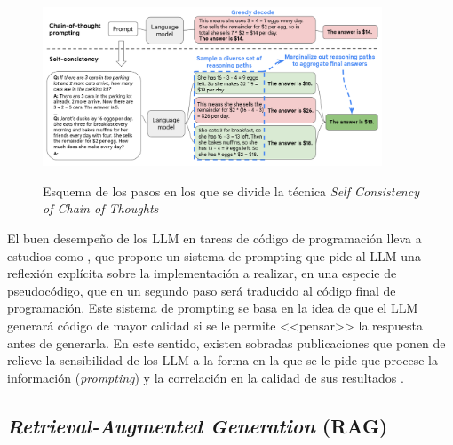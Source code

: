 \begin{figure}[H]
    \caption[]{Esquema de los pasos en los que se divide la técnica \textit{Self Consistency of Chain of Thoughts}}
    \centering
    \includegraphics[width=0.9\textwidth]{./figuras/cot_sc.png}
    \label{fig:cot_sc}
\end{figure}













El buen desempeño de los LLM en tareas de código de programación lleva a estudios como \cite{liStructuredChainofThoughtPrompting2023}, que propone un sistema de prompting que pide al LLM una reflexión explícita sobre la implementación a realizar, en una especie de pseudocódigo, que en un segundo paso será traducido al código final de programación. Este sistema de prompting se basa en la idea de que el LLM generará código de mayor calidad si se le permite <<pensar>> la respuesta antes de generarla. En este sentido, existen sobradas publicaciones que ponen de relieve la sensibilidad de los LLM a la forma en la que se le pide que procese la información (\textit{prompting}) y la correlación en la calidad de sus resultados \citep{zhouLeasttoMostPromptingEnables2023,weiChainofThoughtPromptingElicits2023,LLMPromptingGuide}.
 
\subsection{\textit{Retrieval-Augmented Generation} (RAG)}

